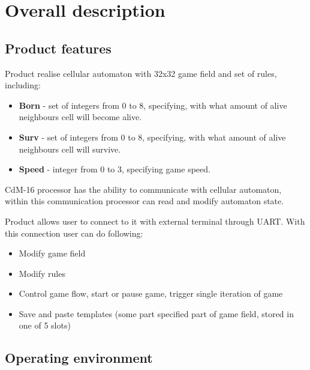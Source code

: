 \chapter*{Overall description}

\section*{Product features}

Product realise cellular automaton with 32x32 game field and set of rules, including:

\begin{itemize}
	\item \textbf{Born} - set of integers from 0 to 8, specifying, with what amount of alive neighbours cell will become alive.
	\item \textbf{Surv} - set of integers from 0 to 8, specifying, with what amount of alive neighbours cell will survive.
	\item \textbf{Speed} - integer from 0 to 3, specifying game speed.
\end{itemize}

CdM-16 processor has the ability to communicate with cellular automaton, within this communication processor can read and modify automaton state.

Product allows user to connect to it with external terminal through UART. With this connection user can do following:

\begin{itemize}
	\item Modify game field
	\item Modify rules
	\item Control game flow, start or pause game, trigger single iteration of game
	\item Save and paste templates (some part specified part of game field, stored in one of 5 slots)
\end{itemize}

\section*{Operating environment}




